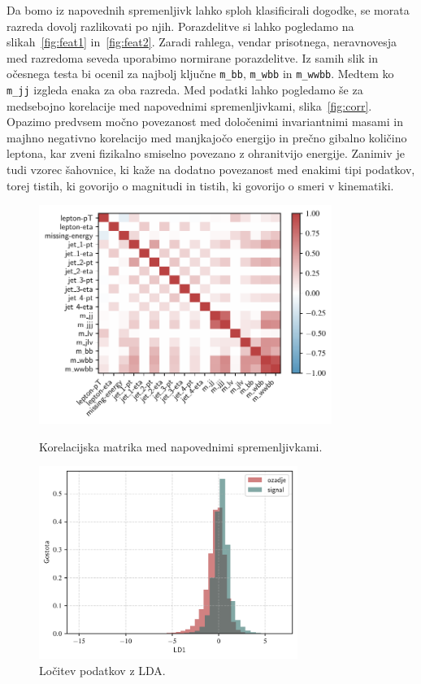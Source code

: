 \documentclass[notoc]{porocilo}
\begin{document}
Da bomo iz napovednih spremenljivk lahko sploh klasificirali dogodke, se morata razreda dovolj razlikovati po njih. Porazdelitve si lahko pogledamo na slikah~\ref{fig:feat1} in~\ref{fig:feat2}. Zaradi rahlega, vendar prisotnega, neravnovesja med razredoma seveda uporabimo normirane porazdelitve. Iz samih slik in očesnega testa bi ocenil za najbolj ključne \texttt{m\_bb}, \texttt{m\_wbb} in \texttt{m\_wwbb}. Medtem ko \texttt{m\_jj} izgleda enaka za oba razreda. Med podatki lahko pogledamo še za medsebojno korelacije med napovednimi spremenljivkami, slika~\ref{fig:corr}. Opazimo predvsem močno povezanost med določenimi invariantnimi masami in majhno negativno korelacijo med manjkajočo energijo in prečno gibalno količino leptona, kar zveni fizikalno smiselno povezano z ohranitvijo energije. Zanimiv je tudi vzorec šahovnice, ki kaže na dodatno povezanost med enakimi tipi podatkov, torej tistih, ki govorijo o magnitudi in tistih, ki govorijo o smeri v kinematiki.



\begin{figure}
    \centering
    \includegraphics[width=0.85\textwidth]{corr.pdf}
    \caption{\label{fig:corr} Korelacijska matrika med napovednimi spremenljivkami.}

    \includegraphics[width=0.75\textwidth]{lda.pdf}
    \caption{\label{fig:lda} Ločitev podatkov z LDA.}
\end{figure}
\end{document}
